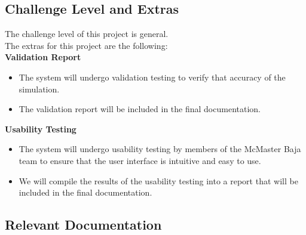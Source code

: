 \documentclass[12pt, titlepage]{article}
\begin{document}
\subsection{Challenge Level and Extras}

The challenge level of this project is general.\\
\newline
The extras for this project are the following:\\
\textbf{Validation Report}
{\begin{itemize}
  \item The system will undergo validation testing to verify that accuracy of the simulation.
  \item The validation report will be included in the final documentation.
\end{itemize}}
{\noindent}
\textbf{Usability Testing}
{\begin{itemize}
  \item The system will undergo usability testing by members of the McMaster Baja team to ensure that
  the user interface is intuitive and easy to use.
  \item We will compile the results of the usability testing into a report that will be included in the final documentation.
\end{itemize}}

\subsection{Relevant Documentation}
\end{document}
